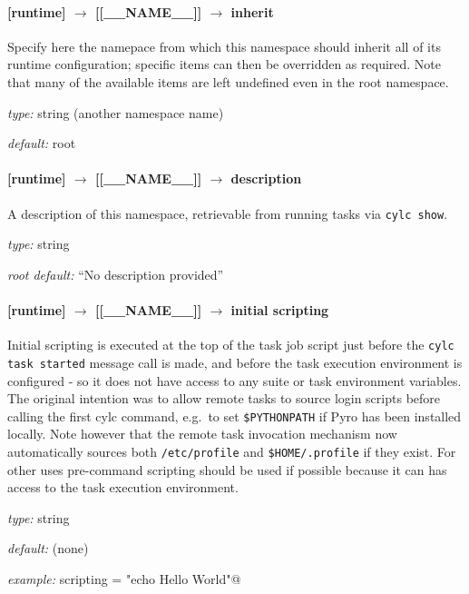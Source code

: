 \paragraph[inherit]{[runtime] $\rightarrow$ [[\_\_NAME\_\_]] $\rightarrow$ inherit}

Specify here the namepace from which this namespace should inherit all
of its runtime configuration; specific items can then be overridden
as required. Note that many of the available items are left undefined even
in the root namespace.

\begin{myitemize}
\item {\em type:} string (another namespace name)
\item {\em default:} root
\end{myitemize}

\paragraph[description]{[runtime] $\rightarrow$ [[\_\_NAME\_\_]] $\rightarrow$ description}

A description of this namespace, retrievable from running tasks via 
\lstinline=cylc show=.
\begin{myitemize}
\item {\em type:} string 
\item {\em root default:} ``No description provided''
\end{myitemize}


\paragraph[initial scripting]{[runtime] $\rightarrow$ [[\_\_NAME\_\_]] $\rightarrow$ initial scripting}

Initial scripting is executed at the top of the task job script just
before the \lstinline=cylc task started= message call is made, and
before the task execution environment is configured - so it does not
have access to any suite or task environment variables.  The original
intention was to allow remote tasks to source login scripts before
calling the first cylc command, e.g.\ to set \lstinline=$PYTHONPATH= if
Pyro has been installed locally. Note however that the remote task
invocation mechanism now automatically sources both
\lstinline=/etc/profile= and \lstinline=$HOME/.profile= if they exist. 
For other uses pre-command scripting should be used if possible because
it can has access to the task execution environment.
\begin{myitemize}
\item {\em type:} string
\item {\em default:} (none)
\item {\em example:} \lstinline@initial scripting = "echo Hello World"@
\end{myitemize}

